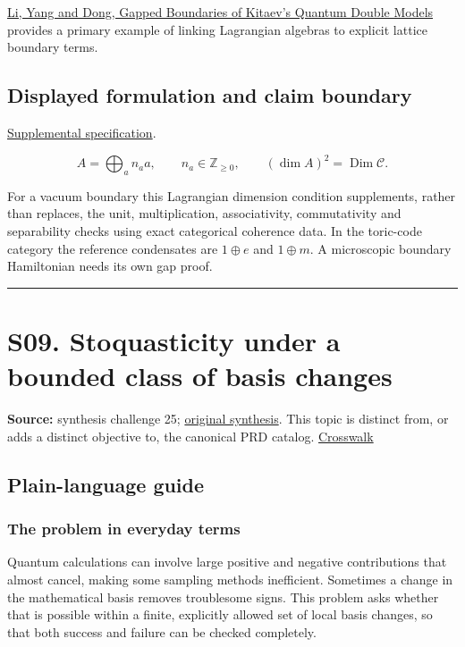 \documentclass[
  11pt,
]{article}
\begin{document}
\href{https://arxiv.org/abs/2504.19512}{Li, Yang and Dong, Gapped
Boundaries of Kitaev's Quantum Double Models} provides a primary example
of linking Lagrangian algebras to explicit lattice boundary terms.

\subsection{Displayed formulation and claim boundary}

\href{https://github.com/rick-stevens-ai/Pure-Thought/blob/main/supplemental/S08.md}{Supplemental
specification}.

\[A=\bigoplus_a n_a a,\qquad n_a\in\mathbb Z_{\ge0},\qquad
(\dim A)^2=\operatorname{Dim}\mathcal C.\]

For a vacuum boundary this Lagrangian dimension condition supplements,
rather than replaces, the unit, multiplication, associativity,
commutativity and separability checks using exact categorical coherence
data. In the toric-code category the reference condensates are
\(1\oplus e\) and \(1\oplus m\). A microscopic boundary Hamiltonian
needs its own gap proof.

\begin{center}\rule{0.5\linewidth}{0.5pt}\end{center}

\section{S09. Stoquasticity under a bounded class of basis changes}

\textbf{Source:} synthesis challenge 25;
\href{https://github.com/rick-stevens-ai/Pure-Thought/blob/main/NOTES/30-Most-Compelling-Pure-Thought-AI-Challenges.md}{original
synthesis}. This topic is distinct from, or adds a distinct objective
to, the canonical PRD catalog.
\href{https://github.com/rick-stevens-ai/Pure-Thought/blob/main/reviews/SYNTHESIS-CROSSWALK.md}{Crosswalk}

\subsection{Plain-language guide}

\subsubsection{The problem in everyday terms}

Quantum calculations can involve large positive and negative
contributions that almost cancel, making some sampling methods
inefficient. Sometimes a change in the mathematical basis removes
troublesome signs. This problem asks whether that is possible within a
finite, explicitly allowed set of local basis changes, so that both
success and failure can be checked completely.
\end{document}
